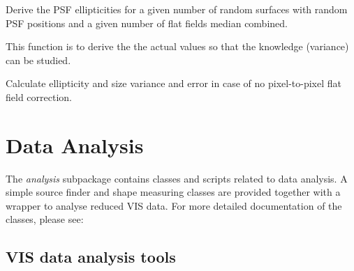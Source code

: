\documentclass[a4paper,12pt,english]{sphinxmanual}
\begin{document}

\begin{fulllineitems}
\label{reduction:analysis.FlatfieldCalibration.testFlatCalibration}
Derive the PSF ellipticities for a given number of random surfaces with random PSF positions
and a given number of flat fields median combined.

This function is to derive the the actual values so that the knowledge (variance) can be studied.

\end{fulllineitems}


\begin{fulllineitems}
\label{reduction:analysis.FlatfieldCalibration.testNoFlatfieldingEffects}
Calculate ellipticity and size variance and error in case of no pixel-to-pixel flat field correction.

\end{fulllineitems}



\chapter{Data Analysis}
\label{index:data-analysis}
The \emph{analysis} subpackage contains classes and scripts related to data analysis. A simple source finder and shape
measuring classes are provided together with a wrapper to analyse reduced VIS data. For more detailed
documentation of the classes, please see:


\section{VIS data analysis tools}
\label{analysis::doc}\label{analysis:module-analysis.analyse}\label{analysis:vis-data-analysis-tools}
\end{document}
